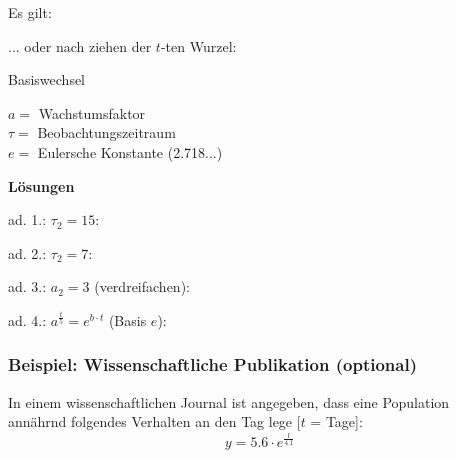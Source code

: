 \begin{center}
  \end{center}

Es gilt:
\begin{center}
\end{center}

... oder nach ziehen der $t$-ten Wurzel:

\begin{gesetz}{Basiswechsel}{}

  \begin{center}\end{center}
  
  $a=$ Wachstumsfaktor\\
  $\tau=$ Beobachtungszeitraum\\
  $e=$ Eulersche Konstante (2.718...)
\end{gesetz}
\newpage


\textbf{Lösungen}

ad. 1.: $\tau_2=15$:

ad. 2.: $\tau_2=7$:

ad. 3.: $a_2 = 3$ (verdreifachen):

ad. 4.: $a^\frac{t}5 = e^{b\cdot{}t}$ (Basis $e$):

\newpage


\subsubsection{Beispiel: Wissenschaftliche Publikation (optional)}
In einem wissenschaftlichen Journal ist angegeben, dass eine Population annährnd folgendes Verhalten an den Tag lege [$t$ = Tage]:
$$y = 5.6\cdot{} e^{\frac{t}{4.1}}$$

